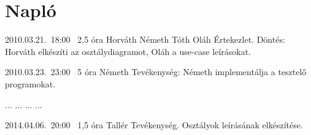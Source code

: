 %
\section{Napló}

\begin{naplo}

\bejegyzes
{2010.03.21.~18:00~} %
{2,5 óra} %
{Horváth\newline
Németh\newline
Tóth\newline
Oláh} %
{Értekezlet. Döntés: Horváth elkészíti az osztálydiagramot, Oláh a use-case leírásokat.} %

\bejegyzes
{2010.03.23.~23:00~}
{5 óra}
{Németh}
{Tevékenység: Németh implementálja a tesztelő programokat.}

\bejegyzes
{...}
{...}
{...}
{...}

\bejegyzes
{2014.04.06.~20:00~} %
{1,5 óra} %
{Tallér} %
{Tevékenység. Osztályok leírásának elkészítése.}



\end{naplo}


